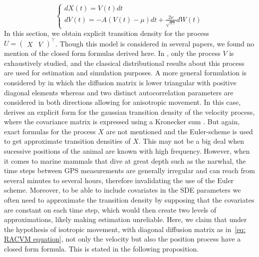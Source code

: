 \documentclass[11pt]{article}
\newcommand {\1}{\mathbb{1}}
\theoremstyle{definition}
\theoremstyle{remark}
\theoremstyle{remark}
\begin{document}
\begin{equation*} \left\{
	\begin{array}{l}
		dX(t)=V(t)dt \\
		dV(t)=-A(V(t)-\mu)dt+\frac{2\nu}{\sqrt{\pi \tau}} dW(t) 
	\end{array}
	\right.
	\label{eq: RACVM equation bis}
\end{equation*}
In this section, we obtain explicit transition density for the process $U=\begin{pmatrix} X & V \end{pmatrix}^\top$. Though this model is considered in several papers, we found no mention of the closed form formulas derived here. In \cite{gurarie_correlated_2017}, only the process $V$ is exhaustively studied, and the classical distributional results about this process are used for estimation and simulation purposes.
A more general formulation is considered by \cite{albertsen_generalizing_2018} in which the diffusion matrix is lower triangular with positive diagonal elements whereas and two distinct autocorrelation parameters are considered in both directions allowing for anisotropic movement.
In this case, \cite{albertsen_generalizing_2018} derives an explicit form for the gaussian transition density of the velocity process, where the covariance matrix is expressed using a Kronecker sum \cite{albertsen_generalizing_2018}. But again, exact formulas for the process $X$ are not mentioned and the Euler-scheme is used to get approximate transition densities of $X$.
This may not be a big deal when sucessive positions of the animal are known with high frequency. However, when it comes to marine mammals that dive at great depth such as the narwhal, the time steps between GPS measurements are generally irregular and can reach from several minutes to several hours, therefore invalidating the use of the Euler scheme. Moreover, to be able to include covariates in the SDE parameters we often need to approximate the transition density by supposing that the covariates are constant on each time step, which would then create two levels of approximations, likely making estimation unreliable.
 Here, we claim that under the hypothesis of isotropic movement, with diagonal diffusion matrix as in~\eqref{eq: RACVM equation}, not only the velocity but also the position process have a closed form formula. This is stated in the following proposition.\\
\end{document}
